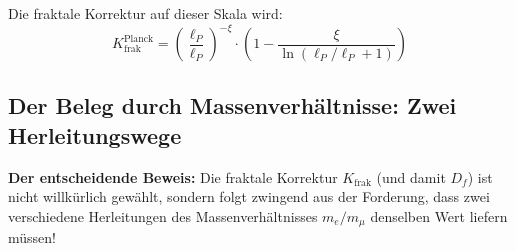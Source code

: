 	Die fraktale Korrektur auf dieser Skala wird:
	\begin{equation}
		K_{\text{frak}}^{\text{Planck}} = \left(\frac{\ell_P}{\ell_P}\right)^{-\xi} \cdot \left(1 - \frac{\xi}{\ln(\ell_P/\ell_P + 1)}\right)
	\end{equation}
	
	\subsection{Der Beleg durch Massenverhältnisse: Zwei Herleitungswege}
	
	\textbf{Der entscheidende Beweis:} Die fraktale Korrektur $K_{\text{frak}}$ (und damit $D_f$) ist nicht willkürlich gewählt, sondern folgt zwingend aus der Forderung, dass zwei verschiedene Herleitungen des Massenverhältnisses $m_e/m_\mu$ denselben Wert liefern müssen!
	
